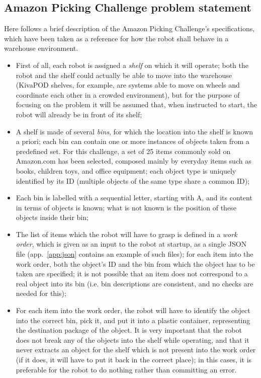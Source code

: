 \subsection{Amazon Picking Challenge problem statement} \label{sec:apc}
Here follows a brief description of the Amazon Picking Challenge's
specifications, which have been taken as a reference for how the robot
shall behave in a warehouse environment.

\begin{itemize}

\item{First of all, each robot is assigned a \emph{shelf} on which it will
operate; both the robot and the shelf could actually be able to move
into the warehouse (KivaPOD shelves, for example, are systems able to
move on wheels and coordinate each other in a crowded environment),
but for the purpose of focusing on the problem it will be assumed
that, when instructed to start, the robot will already be in front of
its shelf;}
\item{A shelf is made of several \emph{bins}, for which the location
into the shelf is known a priori; each bin can contain one or more
instances of objects taken from a predefined set. For this challenge,
a set of 25 items commonly sold on Amazon.com has been selected,
composed mainly by everyday items such as books, children toys, and
office equipment; each object type is uniquely identified by its ID
(multiple objects of the same type share a common ID);}
\item{Each bin is labelled with a sequential letter, starting with A,
and its content in terms of objects is known; what is not known is the
position of these objects inside their bin;}
\item{The list of items which the robot will have to grasp is defined
in a \emph{work order}, which is given as an input to the robot at
startup, as a single JSON file (app.~\ref{app:json} contains an
example of such files); for each item into the work order, both the object's ID and
the bin from which the object has to be taken are specified; it is not
possible that an item does not correspond to a real object into its
bin (i.e. bin descriptions are consistent, and no checks are needed
for this);}
\item{For each item into the work order, the robot will have to
identify the object into the correct bin, pick it, and put it into a
plastic container, representing the destination package of the
object. It is very important that the robot does not break any of the
objects into the shelf while operating, and that it never extracts an
object for the shelf which is not present into the work order (if it
does, it will have to put it back in the correct place); in this
cases, it is preferable for the robot to do nothing rather than
committing an error.}
\end{itemize}

